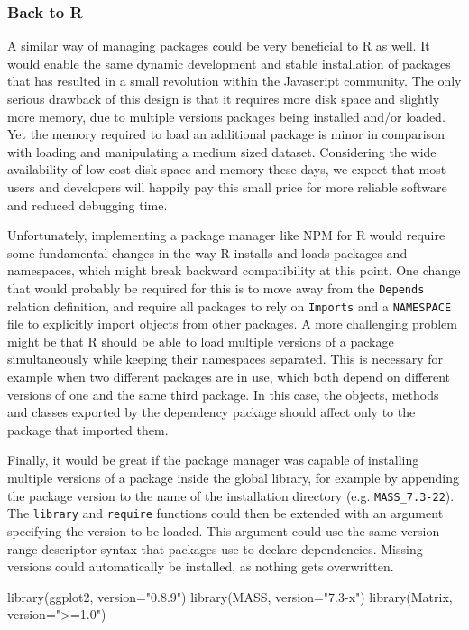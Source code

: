 \subsubsection{Back to R}

A similar way of managing packages could be very beneficial to R as well. It would
enable the same dynamic development and stable installation of packages that has
resulted in a small revolution within the Javascript community. The only serious
drawback of this design is that it requires more disk space and slightly
more memory, due to multiple versions packages being installed and/or loaded.
Yet the memory required to load an additional package is minor in comparison
with loading and manipulating a medium sized dataset. Considering the wide
availability of low cost disk space and memory these days, we expect that most
users and developers will happily pay this small price for more reliable
software and reduced debugging time. 

Unfortunately, implementing a package manager like NPM for R would require some
fundamental changes in the way R installs and loads packages and namespaces,
which might break backward compatibility at this point. One change that would
probably be required for this is to move away from the \texttt{Depends}
relation definition, and require all packages to rely on \texttt{Imports} and a
\texttt{NAMESPACE} file to explicitly import objects from other packages. A
more challenging problem might be that R should be able to load multiple
versions of a package simultaneously while keeping their namespaces separated.
This is necessary for example when two different packages are in use, which
both depend on different versions of one and the same third package. In this
case, the objects, methods and classes exported by the dependency package
should affect only to the package that imported them.

Finally, it would be great if the package manager was capable of installing
multiple versions of a package inside the global library, for example by appending
the package version to the name of the installation directory (e.g. \texttt{MASS\_7.3-22}).
The \texttt{library} and \texttt{require} functions could then be extended with
an argument specifying the version to be loaded. This argument could use the
same version range descriptor syntax that packages use to declare dependencies.
Missing versions could automatically be installed, as nothing gets overwritten.

\begin{example}
  library(ggplot2, version="0.8.9")
  library(MASS, version="7.3-x")
  library(Matrix, version=">=1.0")
\end{example}

